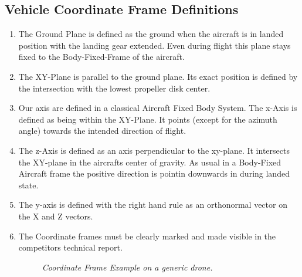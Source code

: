 \documentclass{article}
\begin{document}
\subsection{Vehicle Coordinate Frame Definitions}
\begin{enumerate}
  \item The Ground Plane is defined as the ground when the aircraft is in landed position with the landing gear extended. Even during flight this plane stays fixed to the Body-Fixed-Frame of the aircraft.
  \item The XY-Plane is parallel to the ground plane. Its exact position is defined by the intersection with the lowest propeller disk center.
  \item Our axis are defined in a classical Aircraft Fixed Body System. The x-Axis is defined as being within the XY-Plane. It points (except for the azimuth angle) towards the intended direction of flight.
  \item The z-Axis is defined as an axis perpendicular to the xy-plane. It intersects the XY-plane in the aircrafts center of gravity. As usual in a Body-Fixed Aircraft frame the positive direction is pointin downwards in during landed state.
  \item The y-axis is defined with the right hand rule as an orthonormal vector on the X and Z vectors.
  \item The Coordinate frames must be clearly marked and made visible in the competitors technical report. 
  
  \begin{figure}[h!]
    \centering
   \caption{\textit{Coordinate Frame Example on a generic drone.}}
   \end{figure}
\end{enumerate}
\end{document}
